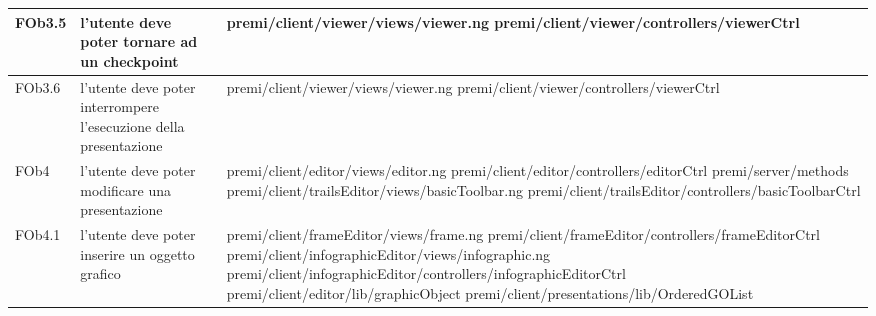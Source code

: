 \begin{longtable}{|l|p{5cm}|p{7cm}|}
\hline
FOb3.5 & l'utente deve poter tornare ad un checkpoint & \hspace{0pt}premi/client/viewer/views/viewer.ng \linebreak \linebreak premi/client/viewer/controllers/viewerCtrl \\
\hline
FOb3.6 & l'utente deve poter interrompere l'esecuzione della presentazione & \hspace{0pt}premi/client/viewer/views/viewer.ng \linebreak \linebreak premi/client/viewer/controllers/viewerCtrl \\
\hline
FOb4 & l'utente deve poter modificare una presentazione & \hspace{0pt}premi/client/editor/views/editor.ng \linebreak \linebreak premi/client/editor/controllers/editorCtrl  \linebreak \linebreak premi/server/methods \linebreak \linebreak premi/client/trailsEditor/views/basicToolbar.ng \linebreak \linebreak premi/client/trailsEditor/controllers/basicToolbarCtrl \\
\hline
FOb4.1 & l'utente deve poter inserire un oggetto grafico & \hspace{0pt}premi/client/frameEditor/views/frame.ng \linebreak \linebreak premi/client/frameEditor/controllers/frameEditorCtrl \linebreak \linebreak premi/client/infographicEditor/views/infographic.ng \linebreak \linebreak premi/client/infographicEditor/controllers/infographicEditorCtrl \linebreak \linebreak premi/client/editor/lib/graphicObject \linebreak \linebreak premi/client/presentations/lib/OrderedGOList \\
\hline

\end{longtable}
